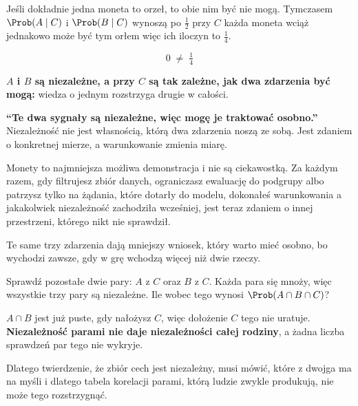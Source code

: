 \begin{fr}

Jeśli dokładnie jedna moneta to orzeł, to obie nim być nie mogą. Tymczasem
$\Prob(A \mid C)$ i $\Prob(B \mid C)$ wynoszą po $\frac{1}{2}$ \dash{} przy
$C$ każda moneta wciąż jednakowo może być tym orłem \dash{} więc ich iloczyn
to $\frac{1}{4}$.

\[ 0 \;\ne\; \tfrac{1}{4} \]

\textbf{$A$ i $B$ są niezależne, a przy $C$ są tak zależne, jak dwa zdarzenia
być mogą:} wiedza o jednym rozstrzyga drugie w całości.
\end{fr}

\begin{fr}
\begin{trapbox}
\textbf{\enquote{Te dwa sygnały są niezależne, więc mogę je traktować
osobno.}} Niezależność nie jest własnością, którą dwa zdarzenia noszą ze sobą.
Jest zdaniem o konkretnej mierze, a warunkowanie zmienia miarę.

Monety to najmniejsza możliwa demonstracja i nie są ciekawostką. Za każdym
razem, gdy filtrujesz zbiór danych, ograniczasz ewaluację do podgrupy albo
patrzysz tylko na żądania, które dotarły do modelu, dokonałeś warunkowania
\dash{} a jakakolwiek niezależność zachodziła wcześniej, jest teraz zdaniem o
innej przestrzeni, którego nikt nie sprawdził.
\end{trapbox}
\end{fr}

\begin{fr}
Te same trzy zdarzenia dają mniejszy wniosek, który warto mieć osobno, bo
wychodzi zawsze, gdy w grę wchodzą więcej niż dwie rzeczy.

Sprawdź pozostałe dwie pary: $A$ z $C$ oraz $B$ z $C$. Każda para się mnoży,
więc wszystkie trzy pary są niezależne. Ile wobec tego wynosi
$\Prob(A \cap B \cap C)$?
\dotline
\nextframe
\end{fr}

\begin{fr}

$A \cap B$ jest już puste, gdy nałożysz $C$, więc dołożenie $C$ tego nie
uratuje. \textbf{Niezależność parami nie daje niezależności całej rodziny}, a
żadna liczba sprawdzeń par tego nie wykryje.

Dlatego twierdzenie, że zbiór cech jest niezależny, musi mówić, które z dwojga
ma na myśli \dash{} i dlatego tabela korelacji parami, którą ludzie zwykle
produkują, nie może tego rozstrzygnąć.
\end{fr}

